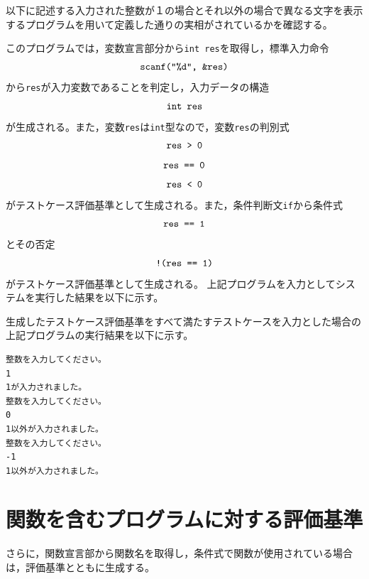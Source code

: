 \documentclass{tpu-sotu}
\begin{document}
以下に記述する入力された整数が１の場合とそれ以外の場合で異なる文字を表示するプログラムを用いて定義した通りの実相がされているかを確認する。

このプログラムでは，変数宣言部分から{\tt int res}を取得し，標準入力命令\\
\[ 
\mbox{{\tt {scanf("\%d", \&res)}}}
\]
から{\tt res}が入力変数であることを判定し，入力データの構造\\
\[
\mbox{{\tt  int res}}
\]
が生成される。また，変数{\tt res}は{\tt int}型なので，変数{\tt res}の判別式\\
\[ 
\mbox{\tt{res > 0}} 
\]
\[
\mbox{\tt{res == 0}}
\]
\[
\mbox{\tt{res < 0}}
\]
がテストケース評価基準として生成される。また，条件判断文{\tt if}から条件式\\
\[
\mbox{\tt{res == 1}}
\]
とその否定\\
\[
\mbox{\tt{!(res == 1)}}
\]
がテストケース評価基準として生成される。
上記プログラムを入力としてシステムを実行した結果を以下に示す。

生成したテストケース評価基準をすべて満たすテストケースを入力とした場合の上記プログラムの実行結果を以下に示す。
\begin{lstlisting}[xleftmargin=1cm]
整数を入力してください。
1
1が入力されました。
整数を入力してください。
0
1以外が入力されました。
整数を入力してください。
-1
1以外が入力されました。
\end{lstlisting}

\section{関数を含むプログラムに対する評価基準}
さらに，関数宣言部から関数名を取得し，条件式で関数が使用されている場合は，評価基準とともに生成する。
\end{document}
